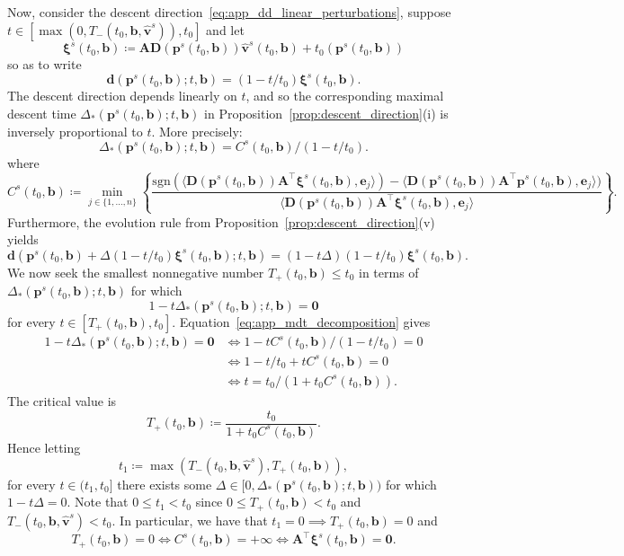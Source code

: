 \documentclass[11pt]{article}
\numberwithin{prop}{section}
\numberwithin{lem}{section}
\numberwithin{rem}{section}
\numberwithin{cor}{section}
\numberwithin{thm}{section}
\numberwithin{defn}{section}
\numberwithin{fact}{section}
\theoremstyle{plain}
\def\bb {\boldsymbol{b}}
\def\bd {\boldsymbol{d}}
\def\tzero {t_{0}}
\def\be {\boldsymbol{e}}
\def\bp {\boldsymbol{p}}
\def\bv {\boldsymbol{v}}
\def\bxi {\boldsymbol{\xi}}
\newcommand{\matr}[1]{\bm{#1}}
\def\sign {\mathrm{sgn}}
\def\Atop {\matr{A}^{\top}}
\begin{document}
Now, consider the descent direction~\eqref{eq:app_dd_linear_perturbations}, suppose $t \in [\max(0,T_{-}(\tzero,\bb,\hat{\bv}^{s})),\tzero]$ and let
\[
\bxi^{s}(\tzero,\bb) \coloneqq \matr{A}\matr{D}(\bp^{s}(\tzero,\bb))\hat{\bv}^{s}(\tzero,\bb) + \tzero(\bp^{s}(\tzero,\bb))
\]
so as to write
\[
\bd(\bp^{s}(\tzero,\bb); t, \bb) = (1-t/\tzero)\bxi^{s}(\tzero,\bb).
\]
The descent direction depends linearly on $t$, and so the corresponding maximal descent time $\Delta_{*}(\bp^{s}(\tzero,\bb);t,\bb)$ in Proposition~\ref{prop:descent_direction}(i) is inversely proportional to $t$. More precisely:
\begin{equation}\label{eq:app_mdt_decomposition}
\Delta_{*}(\bp^{s}(\tzero,\bb);t,\bb) = C^{s}(\tzero,\bb)/(1-t/\tzero).
\end{equation}
where
\[
    C^{s}(\tzero, \bb) \coloneqq
     \min_{j \in \{1,\dots,n\}} \left\{\frac{\sign{\left(\langle \matr{D}(\bp^{s}(\tzero,\bb))\Atop\bxi^{s}(\tzero,\bb),\be_j\rangle\right)} - \langle \matr{D}(\bp^{s}(\tzero,\bb))\Atop\bp^{s}(\tzero,\bb),\be_j\rangle)}{\langle\matr{D}(\bp^{s}(\tzero,\bb)) \Atop\bxi^{s}(\tzero,\bb),\be_j\rangle} \right\}.
\]
Furthermore, the evolution rule from Proposition~\ref{prop:descent_direction}(v) yields
\[
\bd(\bp^{s}(\tzero,\bb) + \Delta(1-t/\tzero)\bxi^{s}(\tzero,\bb); t, \bb) = (1-t\Delta)(1-t/\tzero)\bxi^{s}(\tzero,\bb).
\]
We now seek the smallest nonnegative number $T_{+}(\tzero,\bb) \leqslant \tzero$ in terms of $\Delta_{*}(\bp^{s}(\tzero,\bb);t,\bb)$ for which 
\[
1-t\Delta_{*}(\bp^{s}(\tzero,\bb);t,\bb) = \boldsymbol{0}
\]
for every $t \in [T_{+}(\tzero,\bb),\tzero]$. Equation~\eqref{eq:app_mdt_decomposition} gives
\[
\begin{alignedat}{1}
1-t\Delta_{*}(\bp^{s}(\tzero,\bb);t,\bb) = \boldsymbol{0} &\iff 1-tC^{s}(\tzero,\bb)/(1-t/\tzero) = 0 \\
&\iff 1 - t/\tzero + tC^{s}(\tzero,\bb) = 0\\
&\iff t = \tzero/(1+\tzero C^{s}(\tzero,\bb)).
\end{alignedat}
\]
The critical value is
\[
T_{+}(\tzero,\bb) \coloneqq \frac{\tzero}{1+\tzero C^{s}(\tzero,\bb)}.
\]
Hence letting
\[
t_{1} \coloneqq \max(T_{-}(\tzero,\bb,\hat{\bv}^{s}),T_{+}(\tzero,\bb)),
\]
for every $t \in (t_{1},\tzero]$ there exists some $\Delta \in [0,\Delta_{*}(\bp^{s}(\tzero,\bb);t,\bb))$ for which $1 - t\Delta = 0$. Note that $0 \leqslant t_{1} < \tzero$ since $0 \leqslant T_{+}(\tzero,\bb) < \tzero$ and $T_{-}(\tzero,\bb,\hat{\bv}^{s}) < \tzero$. In particular, we have that $t_{1} = 0 \implies T_{+}(\tzero,\bb) = 0$ and
\[
T_{+}(\tzero,\bb) = 0 \iff C^{s}(\tzero, \bb) = +\infty \iff \Atop\bxi^{s}(\tzero,\bb) = \boldsymbol{0}.
\]
\end{document}
